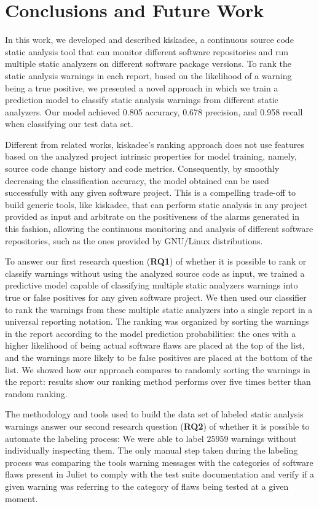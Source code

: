 \chapter{Conclusions and Future Work}
\label{ch:conclusion}

In this work, we developed and described kiskadee, a continuous source code
static analysis tool that can monitor different software repositories and run
multiple static analyzers on different software package versions. To rank the
static analysis warnings in each report, based on the likelihood of a warning
being a true positive, we presented a novel approach in which we train a
prediction model to classify static analysis warnings from different static
analyzers. Our model achieved 0.805 accuracy, 0.678 precision, and 0.958 recall
when classifying our test data set.

Different from related works, kiskadee's ranking approach does not use features
based on the analyzed project intrinsic properties for model training, namely,
source code change history and code metrics. Consequently, by smoothly
decreasing the classification accuracy, the model obtained can be used
successfully with any given software project. This is a compelling trade-off to
build generic tools, like kiskadee, that can perform static analysis in any
project provided as input and arbitrate on the positiveness of the alarms
generated in this fashion, allowing the continuous monitoring and analysis of
different software repositories, such as the ones provided by
GNU/Linux distributions.

To answer our first research question (\textbf{RQ1}) of whether it is possible
to rank or classify warnings without using the analyzed source code as input,
we trained a predictive model capable of classifying multiple static analyzers
warnings into true or false positives for any given software project.  We then
used our classifier to rank the warnings from these multiple static analyzers
into a single report in a universal reporting notation. The ranking was
organized by sorting the warnings in the report according to the model
prediction probabilities: the ones with a higher likelihood of being actual
software flaws are placed at the top of the list, and the warnings more likely
to be false positives are placed at the bottom of the list. We showed how our
approach compares to randomly sorting the warnings in the report: results show
our ranking method performs over five times better than random ranking.

The methodology and tools used to build the data set of labeled static analysis
warnings answer our second research question (\textbf{RQ2}) of whether it is
possible to automate the labeling process: We were able to 
label $25959$ warnings without individually inspecting them. The only manual step
taken during the labeling process was comparing the tools warning messages with
the categories of software flaws present in Juliet to comply with the test suite
documentation and verify if a given warning was referring to the category of flaws
being tested at a given moment.

